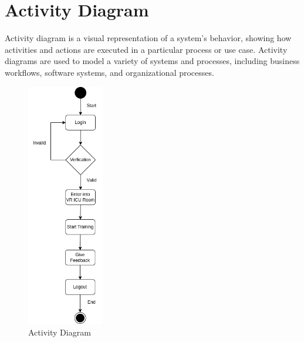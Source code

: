 \section{Activity Diagram}
Activity diagram is a visual representation of a system’s behavior, showing how activities and actions are executed in a particular process or use case. Activity diagrams are used to model a variety of systems and processes, including business workflows, software systems, and organizational processes.
\begin{figure}[h]
    \centering
    \includegraphics[width=0.3\textwidth, height=0.6\textheight]{Images/Activity.drawio.png}
    \caption{Activity Diagram}
    \label{fig:system-diagram}
\end{figure}